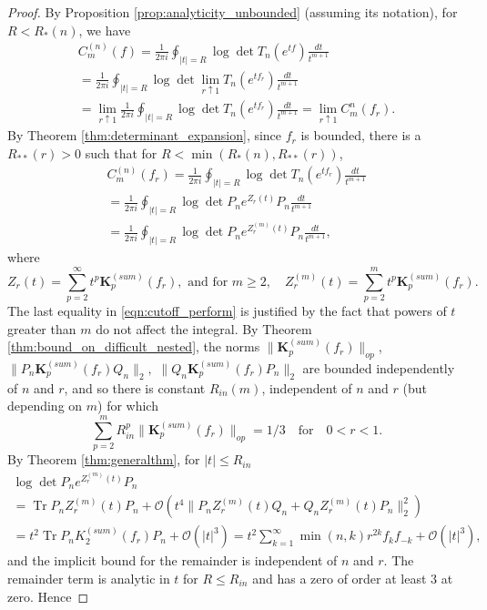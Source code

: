 \documentclass[10pt,a4paper]{amsart}
\DeclareMathOperator{\Tr}{Tr}
\begin{document}
\begin{proof}
By Proposition \ref{prop:analyticity_unbounded} (assuming its notation), for $R<R_*(n)$, we have
\begin{multline}\label{eqn:approximation_C_m}
C_{m}^{(n)}(f)
= \frac{1}{2\pi i}\oint_{|t|=R}\log \det T_n(e^{tf})\frac{dt}{t^{m+1}}
\\=\frac{1}{2\pi i}\oint_{|t|=R}\log \det 
\lim_{r\uparrow 1} T_n(e^{tf_r})\frac{dt}{t^{m+1}}
\\=\lim_{r\uparrow 1}\frac{1}{2\pi i}\oint_{|t|=R}\log \det T_n(e^{tf_r})\frac{dt}{t^{m+1}}
=\lim_{r\uparrow 1} C_m^{n}(f_r).
\end{multline}
By Theorem \ref{thm:determinant_expansion}, since $f_r$ is bounded, there is a $R_{**}(r)>0$ such that for $R<\min(R_*(n), R_{**}(r))$,
\begin{multline}\label{eqn:cutoff_perform}
C_{m}^{(n)}(f_r)
= \frac{1}{2\pi i}\oint_{|t|=R}\log \det T_n(e^{tf_r})\frac{dt}{t^{m+1}}
\\=  \frac{1}{2\pi i}\oint_{|t|=R}\log \det P_n e^{Z_r(t)}P_n\frac{dt}{t^{m+1}}
\\=  \frac{1}{2\pi i}\oint_{|t|=R}\log \det P_n e^{Z_r^{(m)}(t)}P_n\frac{dt}{t^{m+1}}
,
\end{multline}
where
\begin{equation}
Z_r(t)=\sum_{p=2}^{\infty}t^p\mathbf{K}_p^{(sum)}(f_r), \text{ and for } m\geq 2,\quad Z_r^{(m)}(t)=\sum_{p=2}^{m}t^p\mathbf{K}_p^{(sum)}(f_r).
\end{equation}
The last equality in \eqref{eqn:cutoff_perform} is justified by the fact that powers of $t$ greater than $m$ do not affect the integral.
By Theorem \ref{thm:bound_on_difficult_nested}, the norms $\|\mathbf{K}_p^{(sum)}(f_r)\|_{op}$, $\|P_n\mathbf{K}_p^{(sum)}(f_r)Q_n\|_2,$ $\|Q_n\mathbf{K}_p^{(sum)}(f_r)P_n\|_2$ are bounded independently of $n$ and $r$, and so there is constant $R_{in}(m)$, independent of $n$ and $r$
(but depending on $m$) 
for which 
$$\sum_{p=2}^{m}R_{in}^p\|\mathbf{K}_p^{(sum)}(f_r)\|_{op}=1/3\quad\text{for}\quad 0<r<1.$$
By Theorem \ref{thm:generalthm}, for $|t|\leq R_{in}$
\begin{multline}
\log \det P_n e^{Z_r^{(m)}(t)}P_n
\\=  \Tr P_n Z_r^{(m)}(t)P_n+ \mathcal{O}\left( t^4\|P_n Z_r^{(m)}(t) Q_n+Q_nZ_r^{(m)}(t) P_n\|_2^2\right)
\\=t^2 \Tr P_n K_2^{(sum)}(f_r)P_n +\mathcal{O}(|t|^3)=t^2 \sum_{k=1}^{\infty}\min(n, k) r^{2k} f_k f_{-k}+\mathcal{O}(|t|^3),
\end{multline}
and the implicit bound for the remainder is independent of $n$ and $r$. The remainder term is analytic in $t$ for $R\leq R_{in}$ and has a zero of order at least $3$ at zero. Hence 

\end{proof}
\end{document}
